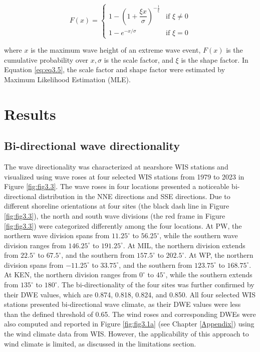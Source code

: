 \begin{equation}
    F(x) =
\begin{cases}
1 - \left(1 + \dfrac{\xi x}{\sigma} \right)^{-\frac{1}{\xi}} & \text{if } \xi \ne 0 \\
1 - e^{-x/\sigma} & \text{if } \xi = 0
\end{cases}
\label{eq:eq3.5}
\end{equation}

where $x$ is the maximum wave height of an extreme wave event, $F(x)$ is the cumulative probability over $x, \sigma$ is the scale factor, and $\xi$ is the shape factor. In Equation \ref{eq:eq3.5}, the scale factor and shape factor were estimated by Maximum Likelihood Estimation (MLE). 

\section{Results}
\label{c3_Results}

\subsection{Bi-directional wave directionality}
\label{c3_Bi-directional wave directionality}

The wave directionality was characterized at nearshore WIS stations and
visualized using wave roses at four selected WIS stations from 1979 to 2023 in
Figure \ref{fig:fig3.3}. The wave roses in four locations presented a noticeable
bi-directional distribution in the NNE directions and SSE directions. Due to
different shoreline orientations at four sites (the black dash line in Figure
\ref{fig:fig3.3}), the north and south wave divisions (the red frame in Figure
\ref{fig:fig3.3}) were categorized differently among the four locations. At PW,
the northern wave division spans from $11.25^\circ$ to $56.25^\circ$, while the
southern wave division ranges from $146.25^\circ$ to $191.25^\circ$. At MIL, the
northern division extends from $22.5^\circ$ to $67.5^\circ$, and the southern
from $157.5^\circ$ to $202.5^\circ$. At WP, the northern division spans from
$-11.25^\circ$ to $33.75^\circ$, and the southern from $123.75^\circ$ to
$168.75^\circ$. At KEN, the northern division ranges from $0^\circ$ to
$45^\circ$, while the southern extends from $135^\circ$ to $180^\circ$. The
bi-directionality of the four sites was further confirmed by their DWE values,
which are 0.874, 0.818, 0.824, and 0.850. All four selected WIS stations
presented bi-directional wave climate, as their DWE values were less than the
defined threshold of 0.65. The wind roses and corresponding DWEs were also
computed and reported in Figure \ref{fig:fig3.1a} (see Chapter
\ref{Appendix}) using the wind climate data from WIS. However, the
applicability of this approach to wind climate is limited, as discussed in the
limitations section.

